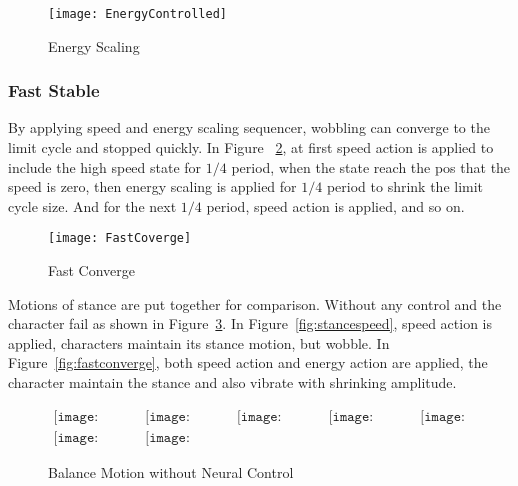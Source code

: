 \begin{figure}[!htbp]
  \begin{center}
      \texttt{[image: EnergyControlled]}
    \caption{Energy Scaling}
    \label{fig:energyscaling}
\end{center}
\end{figure}





\subsubsection*{Fast Stable}
By applying speed and energy scaling sequencer, wobbling can converge to the limit cycle and stopped quickly.
In Figure ~\ref{fig:fastconverg}, at first speed action is applied to include the high speed state for $1/4$ period, when the state reach the pos that the speed is zero, then energy scaling is applied for $1/4$ period to shrink the limit cycle size.
And for the next $1/4$ period, speed action is applied, and so on.

\begin{figure}[!htbp]
  \begin{center}
      \texttt{[image: FastCoverge]}
    \caption{Fast Converge}
    \label{fig:fastconverg}
\end{center}
\end{figure}


Motions of stance are put together for comparison.
Without any control and the character fail as shown in Figure~\ref{fig:stancefall}.
In Figure~\ref{fig:stancespeed}, speed action is applied, characters maintain its stance motion, but wobble.
In Figure~\ref{fig:fastconverge}, both speed action and energy action are applied, the character maintain the stance and also vibrate with shrinking amplitude.




\begin{figure}[h]
\begin{center}$
\begin{array}{ccccc}
\texttt{[image: stanceFall/0001.eps]}&
\texttt{[image: stanceFall/0021.eps]}&
\texttt{[image: stanceFall/0041.eps]}&
\texttt{[image: stanceFall/0061.eps]}&
\texttt{[image: stanceFall/0081.eps]}
\\
\texttt{[image: stanceFall/0101.eps]}&
\texttt{[image: stanceFall/0121.eps]}
\end{array}$
\end{center}
\caption{Balance Motion without Neural Control}
    \label{fig:stancefall}
\end{figure}

